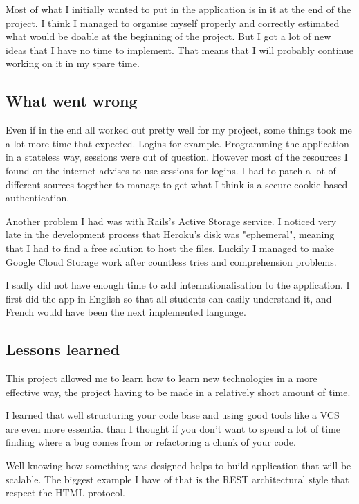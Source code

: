 \documentclass[12pt,a4paper]{article}
\begin{document}
Most of what I initially wanted to put in the application is in it at the end
of the project. I think I managed to organise myself properly and correctly
estimated what would be doable at the beginning of the project. But I got a lot
of new ideas that I have no time to implement. That means that I will probably
continue working on it in my spare time.

\subsection{What went wrong}

Even if in the end all worked out pretty well for my project, some things took me
a lot more time that expected. Logins for example. Programming the application
in a stateless way, sessions were out of question. However most of the
resources I found on the internet advises to use sessions for logins. I had to
patch a lot of different sources together to manage to get what I think is a
secure cookie based authentication.

Another problem I had was with Rails's Active Storage service. I noticed very
late in the development process that Heroku's disk was "ephemeral", meaning
that I had to find a free solution to host the files. Luckily I managed to make
Google Cloud Storage work after countless tries and comprehension problems.

I sadly did not have enough time to add internationalisation to the
application. I first did the app in English so that all students can easily
understand it, and French would have been the next implemented language.

\subsection{Lessons learned}

This project allowed me to learn how to learn new technologies in a more effective
way, the project having to be made in a relatively short amount of time.

I learned that well structuring your code base and using good tools like a VCS
are even more essential than I thought if you don't want to spend a lot of time
finding where a bug comes from or refactoring a chunk of your code.

Well knowing how something was designed helps to build application that will be
scalable. The biggest example I have of that is the REST architectural style
that respect the HTML protocol.
\end{document}
